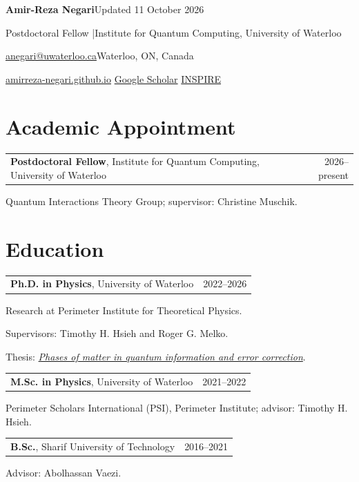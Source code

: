 \documentclass[10pt,letterpaper]{article}
\makeatletter
\newcommand{\dated}[2]{\begin{tabularx}{\linewidth}{@{}Xr@{}}#1 & \textcolor{muted}{#2}\\\end{tabularx}}
\makeatother
\begin{document}
{\fontsize{27}{30}\selectfont\bfseries\color{primaryColor}Amir-Reza Negari}\hfill{\footnotesize\color{muted}Updated 11 October 2026}\par
\vspace{4pt}
Postdoctoral Fellow \enspace|\enspace Institute for Quantum Computing, University of Waterloo\par
\vspace{3pt}
\href{mailto:anegari@uwaterloo.ca}{anegari@uwaterloo.ca}\enspace\textbullet\enspace Waterloo, ON, Canada\par
\href{https://amirreza-negari.github.io/}{amirreza-negari.github.io}\enspace\textbullet\enspace
\href{https://scholar.google.com/citations?hl=en\&user=_kyHGUcAAAAJ}{Google Scholar}\enspace\textbullet\enspace
\href{https://inspirehep.net/authors/2851625}{INSPIRE}

\section{Academic Appointment}
\dated{\textbf{Postdoctoral Fellow}, Institute for Quantum Computing, University of Waterloo}{2026--present}
Quantum Interactions Theory Group; supervisor: Christine Muschik.

\section{Education}
\dated{\textbf{Ph.D. in Physics}, University of Waterloo}{2022--2026}
Research at Perimeter Institute for Theoretical Physics.\par
Supervisors: Timothy H. Hsieh and Roger G. Melko.\par
Thesis: \href{https://hdl.handle.net/10012/23637}{\textit{Phases of matter in quantum information and error correction}}.\par
\vspace{5pt}
\dated{\textbf{M.Sc. in Physics}, University of Waterloo}{2021--2022}
Perimeter Scholars International (PSI), Perimeter Institute; advisor: Timothy H. Hsieh.\par
\vspace{5pt}
\dated{\textbf{B.Sc.}, Sharif University of Technology}{2016--2021}
Advisor: Abolhassan Vaezi.
\end{document}
